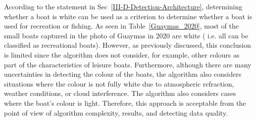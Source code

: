 According to the statement in Sec~\ref{III-D-Detection-Architecture}, determining whether a boat is white can be used as a criterion to determine whether a boat is used for recreation or fishing. As seen in Table~\ref{Guaymas_2020}, most of the small boats captured in the photo of Guaymas in 2020 are white ( i.e. all can be classified as recreational boats). However, as previously discussed, this conclusion is limited since the algorithm does not consider, for example, other colours as part of the characteristics of leisure boats. Furthermore, although there are many uncertainties in detecting the colour of the boats, the algorithm also considers situations where the colour is not fully white due to atmospheric refraction, weather conditions, or cloud interference. The algorithm also considers cases where the boat's colour is light. Therefore, this approach is acceptable from the point of view of algorithm complexity, results, and detecting data quality.